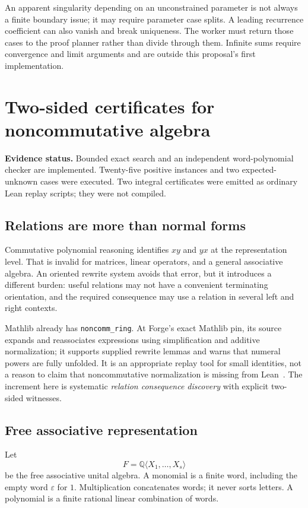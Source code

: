 \documentclass[11pt,letterpaper]{article}
\newcommand{\Q}{\mathbb Q}\newcommand{\R}{\mathbb R}\newcommand{\N}{\mathbb N}
\newcommand{\code}[1]{\texttt{#1}}
\newcommand{\status}[1]{\par\smallskip\noindent\textbf{Evidence status.} #1\par\smallskip}
\theoremstyle{definition}\newtheorem{definition}[theorem]{Definition}
\theoremstyle{remark}\newtheorem{remark}[theorem]{Remark}
\begin{document}
An apparent singularity depending on an unconstrained parameter is not always
a finite boundary issue; it may require parameter case splits. A leading
recurrence coefficient can also vanish and break uniqueness. The worker must
return those cases to the proof planner rather than divide through them.
Infinite sums require convergence and limit arguments and are outside this
proposal's first implementation.

\section{Two-sided certificates for noncommutative algebra}
\label{sec:nc}
\status{Bounded exact search and an independent word-polynomial checker are
implemented. Twenty-five positive instances and two expected-unknown cases
were executed. Two integral certificates were emitted as ordinary Lean replay
scripts; they were not compiled.}

\subsection{Relations are more than normal forms}
Commutative polynomial reasoning identifies $xy$ and $yx$ at the representation
level. That is invalid for matrices, linear operators, and a general associative
algebra. An oriented rewrite system avoids that error, but it introduces a
different burden: useful relations may not have a convenient terminating
orientation, and the required consequence may use a relation in several left
and right contexts.

Mathlib already has \code{noncomm\_ring}. At Forge's exact Mathlib pin, its
source expands and reassociates expressions using simplification and additive
normalization; it supports supplied rewrite lemmas and warns that numeral
powers are fully unfolded. It is an appropriate replay tool for small
identities, not a reason to claim that noncommutative normalization is missing
from Lean~\cite{noncomm-ring}. The increment here is systematic \emph{relation
consequence discovery} with explicit two-sided witnesses.

\subsection{Free associative representation}
Let
\[
 F=\Q\langle X_1,\ldots,X_s\rangle
\]
be the free associative unital algebra. A monomial is a finite word, including
the empty word $\varepsilon$ for $1$. Multiplication concatenates words; it
never sorts letters. A polynomial is a finite rational linear combination of
words.
\end{document}
